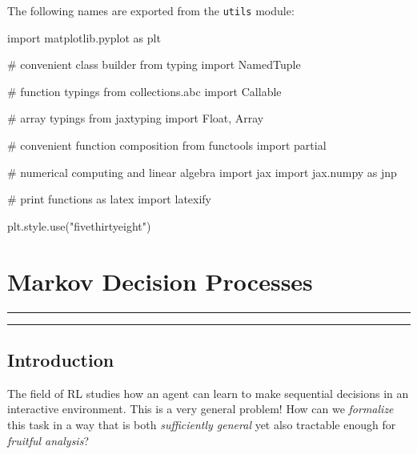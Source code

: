 \documentclass[
  letterpaper,
  DIV=11,
  numbers=noendperiod]{scrreprt}
\newenvironment{Shaded}{\begin{snugshade}}{\end{snugshade}}
\newcommand{\CommentTok}[1]{\textcolor[rgb]{0.37,0.37,0.37}{#1}}
\newcommand{\ImportTok}[1]{\textcolor[rgb]{0.00,0.46,0.62}{#1}}
\newcommand{\NormalTok}[1]{\textcolor[rgb]{0.00,0.23,0.31}{#1}}
\newcommand{\StringTok}[1]{\textcolor[rgb]{0.13,0.47,0.30}{#1}}
\theoremstyle{plain}
\theoremstyle{plain}
\theoremstyle{definition}
\theoremstyle{definition}
\theoremstyle{remark}
\begin{document}
The following names are exported from the \texttt{utils} module:

\begin{Shaded}
\begin{Highlighting}[]
\ImportTok{import}\NormalTok{ matplotlib.pyplot }\ImportTok{as}\NormalTok{ plt}

\CommentTok{\# convenient class builder}
\ImportTok{from}\NormalTok{ typing }\ImportTok{import}\NormalTok{ NamedTuple}

\CommentTok{\# function typings}
\ImportTok{from}\NormalTok{ collections.abc }\ImportTok{import}\NormalTok{ Callable}

\CommentTok{\# array typings}
\ImportTok{from}\NormalTok{ jaxtyping }\ImportTok{import}\NormalTok{ Float, Array}

\CommentTok{\# convenient function composition}
\ImportTok{from}\NormalTok{ functools }\ImportTok{import}\NormalTok{ partial}

\CommentTok{\# numerical computing and linear algebra}
\ImportTok{import}\NormalTok{ jax}
\ImportTok{import}\NormalTok{ jax.numpy }\ImportTok{as}\NormalTok{ jnp}

\CommentTok{\# print functions as latex}
\ImportTok{import}\NormalTok{ latexify}

\NormalTok{plt.style.use(}\StringTok{"fivethirtyeight"}\NormalTok{)}
\end{Highlighting}
\end{Shaded}


\chapter{Markov Decision Processes}\label{sec-mdps}

\begin{center}\rule{0.5\linewidth}{0.5pt}\end{center}

\begin{center}\rule{0.5\linewidth}{0.5pt}\end{center}

\section{Introduction}\label{introduction-1}

The field of RL studies how an agent can learn to make sequential
decisions in an interactive environment. This is a very general problem!
How can we \emph{formalize} this task in a way that is both
\emph{sufficiently general} yet also tractable enough for \emph{fruitful
analysis}?
\end{document}
